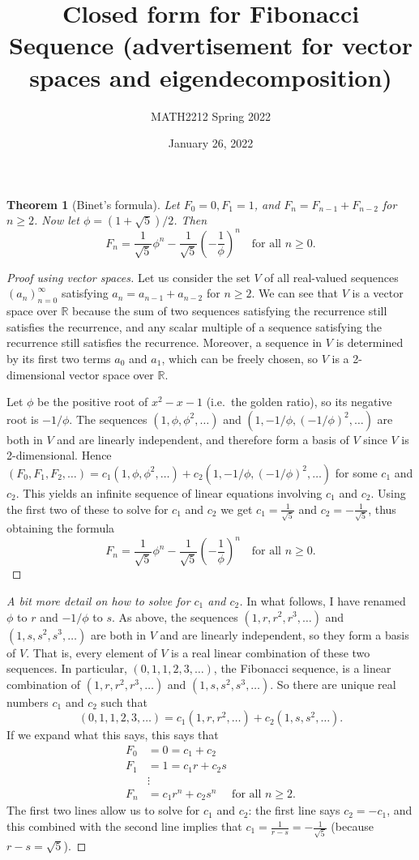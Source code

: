 \documentclass[12pt]{article}
\title{Closed form for Fibonacci Sequence (advertisement for vector spaces and eigendecomposition)}
\author{MATH2212 Spring 2022}
\date{January 26, 2022}
\newtheorem{theorem}{Theorem}
\newcommand{\bR}{\mathbb{R}}
\begin{document}
\maketitle

\begin{theorem}[Binet's formula]
    Let $F_0=0,F_1=1$, and $F_n=F_{n-1}+F_{n-2}$ for $n\geq 2$. Now let $\phi=(1+\sqrt5)/2$. Then
    \[F_n=\frac 1{\sqrt5}\phi^n-\frac 1{\sqrt5}\left(-\frac 1{\phi}\right)^n\quad\text{for all }n\geq 0.\]
\end{theorem}
\begin{proof}[Proof using vector spaces]
    Let us consider the set $V$ of all real-valued sequences $(a_n)_{n=0}^\infty$ satisfying $a_n=a_{n-1}+a_{n-2}$ for $n\geq 2$. We can see that $V$ is a vector space over $\bR$ because the sum of two sequences satisfying the recurrence still satisfies the recurrence, and any scalar multiple of a sequence satisfying the recurrence still satisfies the recurrence. Moreover, a sequence in $V$ is determined by its first two terms $a_0$ and $a_1$, which can be freely chosen, so $V$ is a 2-dimensional vector space over $\bR$.
    
    Let $\phi$ be the positive root of $x^2-x-1$ (i.e.\ the golden ratio), so its negative root is $-1/\phi$. The sequences $(1,\phi,\phi^2,\dots)$ and $(1,-1/\phi,(-1/\phi)^2,\dots)$ are both in $V$ and are linearly independent, and therefore form a basis of $V$ since $V$ is 2-dimensional. Hence $(F_0,F_1,F_2,\dots)=c_1(1,\phi,\phi^2,\dots)+c_2(1,-1/\phi,(-1/\phi)^2,\dots)$ for some $c_1$ and $c_2$. This yields an infinite sequence of linear equations involving $c_1$ and $c_2$. Using the first two of these to solve for $c_1$ and $c_2$ we get $c_1=\frac 1{\sqrt5}$ and $c_2=-\frac 1{\sqrt5}$, thus obtaining the formula
    \[F_n=\frac 1{\sqrt5}\phi^n-\frac 1{\sqrt5}\left(-\frac 1{\phi}\right)^n\quad\text{for all }n\geq 0.\]
\end{proof}
\newpage
\begin{proof}[A bit more detail on how to solve for $c_1$ and $c_2$]
    In what follows, I have renamed $\phi$ to $r$ and $-1/\phi$ to $s$. As above, the sequences $(1,r,r^2,r^3,\dots)$ and $(1,s,s^2,s^3,\dots)$ are both in $V$ and are linearly independent, so they form a basis of $V$. That is, every element of $V$ is a real linear combination of these two sequences. In particular, $(0,1,1,2,3,\dots)$, the Fibonacci sequence, is a linear combination of $(1,r,r^2,r^3,\dots)$ and $(1,s,s^2,s^3,\dots)$. So there are unique real numbers $c_1$ and $c_2$ such that
    \[(0,1,1,2,3,\dots) = c_1(1,r,r^2,\dots)+c_2(1,s,s^2,\dots).\]
    If we expand what this says, this says that
    \begin{align*}
        F_0&=0 =c_1+c_2\\
        F_1&=1 = c_1r+c_2s\\
        &\vdots \\
        F_n &=c_1r^n+c_2s^n\quad\text{ for all }n\geq 2.
    \end{align*}
    The first two lines allow us to solve for $c_1$ and $c_2$: the first line says $c_2=-c_1$, and this combined with the second line implies that $c_1=\frac 1{r-s}=-\frac 1{\sqrt5}$ (because $r-s=\sqrt5$).
\end{proof}
\end{document}

